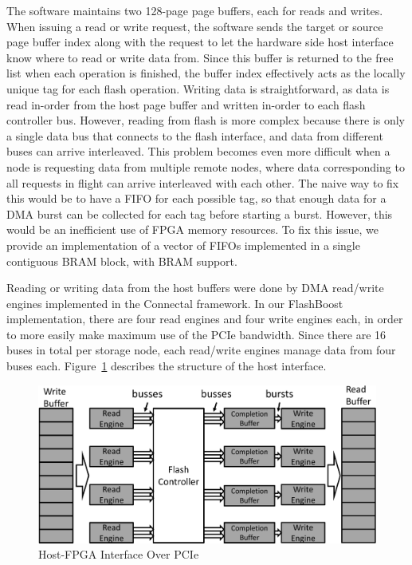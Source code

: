 The software maintains two 128-page page buffers, each for reads and writes. When
issuing a read or write request, the software sends the target or source page
buffer index along with the request to let the hardware side host interface know
where to read or write data from. Since this buffer is returned to the free list
when each operation is finished, the buffer index effectively acts as the locally
unique tag for each flash operation. Writing data is straightforward, as data is
read in-order from the host page buffer and written in-order to each flash
controller bus. 
However, reading from flash is more complex because there is only a single data
bus that connects to the flash interface, and data from different buses can
arrive interleaved. This problem becomes even more
difficult when a node is requesting data from multiple remote nodes, where 
data corresponding to all requests in flight can arrive interleaved with each
other. The naive way to fix this would be to have a FIFO for each possible
tag, so that enough data for a DMA burst can be collected for each tag before
starting a burst. However, this would be an inefficient use of FPGA memory
resources.
To fix this issue, we provide an implementation of a vector of FIFOs implemented
in a single contiguous BRAM block, with BRAM support.

Reading or writing data from the host buffers were done by DMA read/write
engines implemented in the Connectal framework. In our FlashBoost
implementation, there are four read engines and four write engines each, in
order to more easily make maximum use of the PCIe bandwidth. Since there are 16
buses in total per storage node, each read/write engines manage data from four
buses each. Figure~\ref{fig:hostinterface} describes the structure of the host
interface.

\begin{figure}[ht!]
	\centering
	\includegraphics[width=0.4	\textwidth]{figures/hostinterface-crop.pdf}
	\caption{Host-FPGA Interface Over PCIe}
	\label{fig:hostinterface}
\end{figure}

